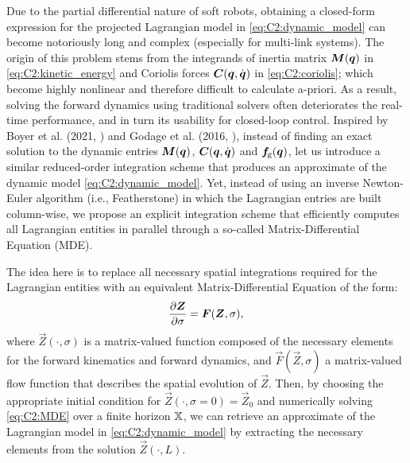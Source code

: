 Due to the partial differential nature of soft robots, obtaining a closed-form expression for the projected Lagrangian model in \eqref{eq:C2:dynamic_model} can become notoriously long and complex (especially for multi-link systems). The origin of this problem stems from the integrands of inertia matrix $\boldsymbol{M}({\boldsymbol{q}})$ in \eqref{eq:C2:kinetic_energy} and Coriolis forces $\boldsymbol{C}({\boldsymbol{q}},{\dot{\boldsymbol{q}}})$ in \eqref{eq:C2:coriolis}; which become highly nonlinear and therefore difficult to calculate a-priori. As a result, solving the forward dynamics using traditional solvers often deteriorates the real-time performance, and in turn its usability for closed-loop control. Inspired by Boyer et al. (2021, \cite{Boyer2021}) and Godage et al. (2016,
\cite{Godage2016}), instead of finding an exact solution to the dynamic entries $\boldsymbol{M}({\boldsymbol{q}})$, $\boldsymbol{C}({\boldsymbol{q}},{\dot{\boldsymbol{q}}})$ and $\boldsymbol{f}\!_{\scriptstyle\textrm{g}}({\boldsymbol{q}})$, let us introduce a similar reduced-order integration scheme that produces an approximate of the dynamic model \eqref{eq:C2:dynamic_model}. Yet, instead of using an inverse Newton-Euler algorithm (i.e., Featherstone) in which the Lagrangian entries are built column-wise, we propose an explicit integration scheme that efficiently computes all Lagrangian entities in parallel through a so-called Matrix-Differential Equation (MDE).

The idea here is to replace all necessary spatial integrations required for the Lagrangian entities with an equivalent Matrix-Differential Equation of the form:
%
\begin{equation}
\frac{\partial \boldsymbol{Z}}{\partial \sigma} = \boldsymbol{F}(\boldsymbol{Z},\sigma), \label{eq:C2:MDE}
\end{equation}
%
where $\vec{Z}(\cdot,\sigma)$ is a matrix-valued function composed of the necessary elements for the forward kinematics and forward dynamics, and $\vec{F}(\vec{Z},\sigma)$ a matrix-valued flow function that describes the spatial evolution of $\vec{Z}$. Then, by choosing the appropriate initial condition for $\vec{Z}(\cdot,\sigma = 0) = \vec{Z}_0$ and numerically solving \eqref{eq:C2:MDE} over a finite horizon $\mathbb{X}$, we can retrieve an approximate of the Lagrangian model in
\eqref{eq:C2:dynamic_model} by extracting the necessary elements from the solution $\vec{Z}(\cdot,L)$.

